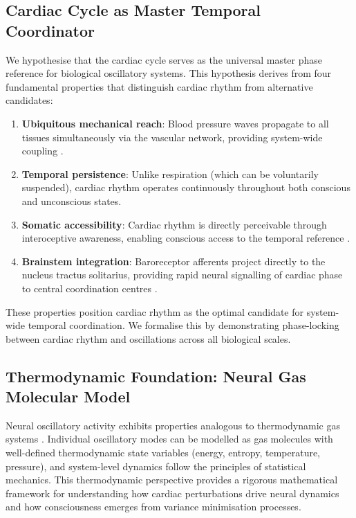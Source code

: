 \documentclass[12pt]{article}
\theoremstyle{remark}
\begin{document}
\subsection{Cardiac Cycle as Master Temporal Coordinator}

We hypothesise that the cardiac cycle serves as the universal master phase reference for biological oscillatory systems. This hypothesis derives from four fundamental properties that distinguish cardiac rhythm from alternative candidates:

\begin{enumerate}
\item \textbf{Ubiquitous mechanical reach}: Blood pressure waves propagate to all tissues simultaneously via the vascular network, providing system-wide coupling \citep{avolio2010arterial}.

\item \textbf{Temporal persistence}: Unlike respiration (which can be voluntarily suspended), cardiac rhythm operates continuously throughout both conscious and unconscious states.

\item \textbf{Somatic accessibility}: Cardiac rhythm is directly perceivable through interoceptive awareness, enabling conscious access to the temporal reference \citep{critchley2004neural}.

\item \textbf{Brainstem integration}: Baroreceptor afferents project directly to the nucleus tractus solitarius, providing rapid neural signalling of cardiac phase to central coordination centres \citep{dampney1994functional}.
\end{enumerate}

These properties position cardiac rhythm as the optimal candidate for system-wide temporal coordination. We formalise this by demonstrating phase-locking between cardiac rhythm and oscillations across all biological scales.

\subsection{Thermodynamic Foundation: Neural Gas Molecular Model}

Neural oscillatory activity exhibits properties analogous to thermodynamic gas systems \citep{friston2006free}. Individual oscillatory modes can be modelled as gas molecules with well-defined thermodynamic state variables (energy, entropy, temperature, pressure), and system-level dynamics follow the principles of statistical mechanics. This thermodynamic perspective provides a rigorous mathematical framework for understanding how cardiac perturbations drive neural dynamics and how consciousness emerges from variance minimisation processes.
\end{document}
